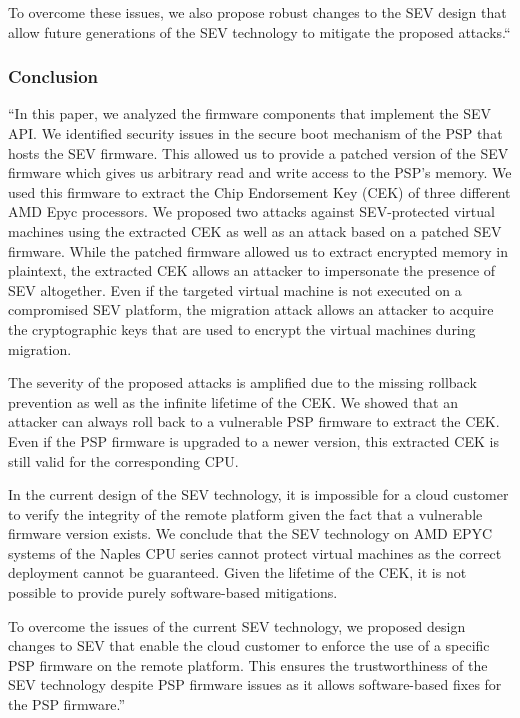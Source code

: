 To overcome these issues, we also propose robust changes to the SEV design that allow future generations of the SEV technology to mitigate the proposed attacks.“

\subsubsection*{Conclusion \cite{buhren_insecure_2019}}
“In this paper, we analyzed the firmware components that implement the SEV API. We identified security issues in the secure boot mechanism of the PSP that hosts the SEV firmware. This allowed us to provide a patched version of the SEV firmware which gives us arbitrary read and write access to the PSP’s memory. We used this firmware to extract the Chip Endorsement Key (CEK) of three different AMD Epyc processors. We proposed two attacks against SEV-protected virtual machines using the extracted CEK as well as an attack based on a patched SEV firmware. While the patched firmware allowed us to extract encrypted memory in plaintext, the extracted CEK allows an attacker to impersonate the presence of SEV altogether. Even if the targeted virtual machine is not executed on a compromised SEV platform, the migration attack allows an attacker to acquire the cryptographic keys that are used to encrypt the virtual machines during migration.

The severity of the proposed attacks is amplified due to the missing rollback prevention as well as the infinite lifetime of the CEK. We showed that an attacker can always roll back to a vulnerable PSP firmware to extract the CEK. Even if the PSP firmware is upgraded to a newer version, this extracted CEK is still valid for the corresponding CPU.

In the current design of the SEV technology, it is impossible for a cloud customer to verify the integrity of the remote platform given the fact that a vulnerable firmware version exists. We conclude that the SEV technology on AMD EPYC systems of the Naples CPU series cannot protect virtual machines as the correct deployment cannot be guaranteed. Given the lifetime of the CEK, it is not possible to provide purely software-based mitigations.

To overcome the issues of the current SEV technology, we proposed design changes to SEV that enable the cloud customer to enforce the use of a specific PSP firmware on the remote platform. This ensures the trustworthiness of the SEV technology despite PSP firmware issues as it allows software-based fixes for the PSP firmware.”

